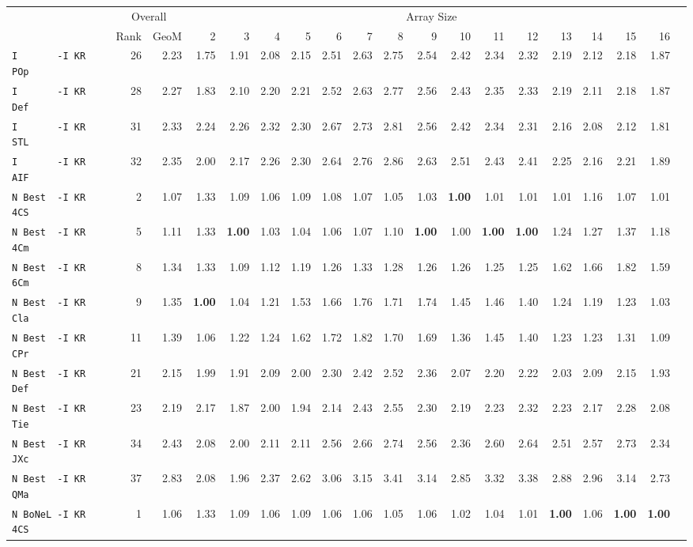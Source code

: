 \begin{tabular}{l | r @{~~} r | r@{~~}r@{~~}r@{~~}r@{~~}r@{~~}r@{~~}r@{~~}r@{~~}r@{~~}r@{~~}r@{~~}r@{~~}r@{~~}r@{~~}r@{~~}r|}
 & \multicolumn{2}{c|}{Overall} & \multicolumn{15}{c}{Array Size} \\
 & Rank & GeoM & 2&3&4&5&6&7&8&9&10&11&12&13&14&15&16\\ \hline
\verb+I       -I KR POp+ & 26 & 2.23 & 1.75&1.91&2.08&2.15&2.51&2.63&2.75&2.54&2.42&2.34&2.32&2.19&2.12&2.18&1.87\\
\verb+I       -I KR Def+ & 28 & 2.27 & 1.83&2.10&2.20&2.21&2.52&2.63&2.77&2.56&2.43&2.35&2.33&2.19&2.11&2.18&1.87\\
\verb+I       -I KR STL+ & 31 & 2.33 & 2.24&2.26&2.32&2.30&2.67&2.73&2.81&2.56&2.42&2.34&2.31&2.16&2.08&2.12&1.81\\
\verb+I       -I KR AIF+ & 32 & 2.35 & 2.00&2.17&2.26&2.30&2.64&2.76&2.86&2.63&2.51&2.43&2.41&2.25&2.16&2.21&1.89\smallskip \\
\verb+N Best  -I KR 4CS+ & 2 & 1.07 & 1.33&1.09&1.06&1.09&1.08&1.07&1.05&1.03&\textbf{1.00}&1.01&1.01&1.01&1.16&1.07&1.01\\
\verb+N Best  -I KR 4Cm+ & 5 & 1.11 & 1.33&\textbf{1.00}&1.03&1.04&1.06&1.07&1.10&\textbf{1.00}&1.00&\textbf{1.00}&\textbf{1.00}&1.24&1.27&1.37&1.18\\
\verb+N Best  -I KR 6Cm+ & 8 & 1.34 & 1.33&1.09&1.12&1.19&1.26&1.33&1.28&1.26&1.26&1.25&1.25&1.62&1.66&1.82&1.59\\
\verb+N Best  -I KR Cla+ & 9 & 1.35 & \textbf{1.00}&1.04&1.21&1.53&1.66&1.76&1.71&1.74&1.45&1.46&1.40&1.24&1.19&1.23&1.03\\
\verb+N Best  -I KR CPr+ & 11 & 1.39 & 1.06&1.22&1.24&1.62&1.72&1.82&1.70&1.69&1.36&1.45&1.40&1.23&1.23&1.31&1.09\\
\verb+N Best  -I KR Def+ & 21 & 2.15 & 1.99&1.91&2.09&2.00&2.30&2.42&2.52&2.36&2.07&2.20&2.22&2.03&2.09&2.15&1.93\\
\verb+N Best  -I KR Tie+ & 23 & 2.19 & 2.17&1.87&2.00&1.94&2.14&2.43&2.55&2.30&2.19&2.23&2.32&2.23&2.17&2.28&2.08\\
\verb+N Best  -I KR JXc+ & 34 & 2.43 & 2.08&2.00&2.11&2.11&2.56&2.66&2.74&2.56&2.36&2.60&2.64&2.51&2.57&2.73&2.34\\
\verb+N Best  -I KR QMa+ & 37 & 2.83 & 2.08&1.96&2.37&2.62&3.06&3.15&3.41&3.14&2.85&3.32&3.38&2.88&2.96&3.14&2.73\smallskip \\
\verb+N BoNeL -I KR 4CS+ & 1 & 1.06 & 1.33&1.09&1.06&1.09&1.06&1.06&1.05&1.06&1.02&1.04&1.01&\textbf{1.00}&1.06&\textbf{1.00}&\textbf{1.00}\\

\end{tabular}
